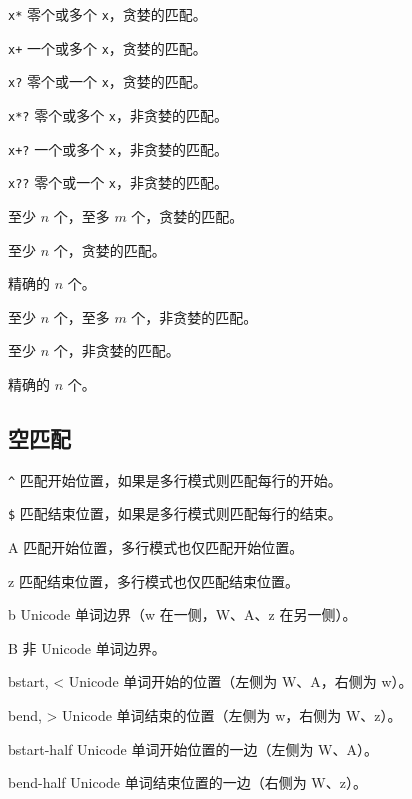 \documentclass[class=article,openany]{cusdoc}[2025/10/10]
\begin{document}
\begin{regexsyntax}
  \item[\texttt{x*}] 零个或多个 \texttt{x}，贪婪的匹配。
  \item[\texttt{x+}] 一个或多个 \texttt{x}，贪婪的匹配。
  \item[\texttt{x?}] 零个或一个 \texttt{x}，贪婪的匹配。
  \item[\texttt{x*?}] 零个或多个 \texttt{x}，非贪婪的匹配。
  \item[\texttt{x+?}] 一个或多个 \texttt{x}，非贪婪的匹配。
  \item[\texttt{x??}] 零个或一个 \texttt{x}，非贪婪的匹配。
  \item[\texttt{\V{x{n,m}}}] 至少 $n$ 个，至多 $m$ 个，贪婪的匹配。
  \item[\texttt{\V{x{n,}}}] 至少 $n$ 个，贪婪的匹配。
  \item[\texttt{\V{x{n}}}] 精确的 $n$ 个。
  \item[\texttt{\V{x{n,m}?}}] 至少 $n$ 个，至多 $m$ 个，非贪婪的匹配。
  \item[\texttt{\V{x{n,}?}}] 至少 $n$ 个，非贪婪的匹配。
  \item[\texttt{\V{x{n}?}}] 精确的 $n$ 个。
\end{regexsyntax}

\subsection{空匹配}\label{sec:empty-matches}

\begin{regexsyntax}
  \item[\texttt{\V^}] 匹配开始位置，如果是多行模式则匹配每行的开始。
  \item[\texttt{\V\$}] 匹配结束位置，如果是多行模式则匹配每行的结束。
  \item[\escape A] 匹配开始位置，多行模式也仅匹配开始位置。
  \item[\escape z] 匹配结束位置，多行模式也仅匹配结束位置。
  \item[\escape b] Unicode 单词边界（\escape w 在一侧，\escape W、\escape A、\escape z 在另一侧）。
  \item[\escape B] 非 Unicode 单词边界。
  \item[\escape b{start}, \escape <] Unicode 单词开始的位置（左侧为 \escape W、\escape A，右侧为 \escape w）。
  \item[\escape b{end}, \escape >] Unicode 单词结束的位置（左侧为 \escape w，右侧为 \escape W、\escape z）。
  \item[\escape b{start-half}] Unicode 单词开始位置的一边（左侧为 \escape W、\escape A）。
  \item[\escape b{end-half}] Unicode 单词结束位置的一边（右侧为 \escape W、\escape z）。
\end{regexsyntax}
\end{document}
